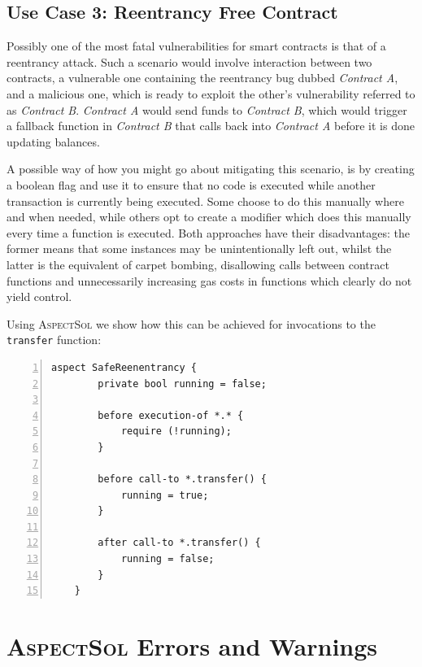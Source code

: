 \documentclass{article}
\newcommand{\AspectSol}{\textsc{AspectSol}\xspace}
\begin{document}
\subsection{Use Case 3: Reentrancy Free Contract}

Possibly one of the most fatal vulnerabilities for smart contracts is that of a reentrancy attack. Such a scenario would involve interaction between two contracts, a vulnerable one containing the reentrancy bug dubbed \textit{Contract A}, and a malicious one, which is ready to exploit the other's vulnerability referred to as \textit{Contract B}. \textit{Contract A} would send funds to \textit{Contract B}, which would trigger a fallback function in \textit{Contract B} that calls back into \textit{Contract A} before it is done updating balances.

A possible way of how you might go about mitigating this scenario, is by creating a boolean flag and use it to ensure that no code is executed while another transaction is currently being executed. Some choose to do this manually where and when needed, while others opt to create a modifier which does this manually every time a function is executed. Both approaches have their disadvantages: the former means that some instances may be unintentionally left out, whilst the latter is the equivalent of carpet bombing, disallowing calls between contract functions and unnecessarily increasing gas costs in functions which clearly do not yield control.

Using \AspectSol we show how this can be achieved for invocations to the \texttt{transfer} function:

\small\begin{lstlisting}[language=Solidity,numbers=left,numbersep=2pt,xleftmargin=0.3cm,label={code:reentracnyMitigationScript}, caption={Reentrancy Mitigation \AspectSol Script.}]
    aspect SafeReenentrancy {
        private bool running = false;
        
        before execution-of *.* { 
            require (!running);
        }
        
        before call-to *.transfer() {
            running = true;
        }
        
        after call-to *.transfer() {
            running = false;
        }
    }
\end{lstlisting}\normalsize
		
		
\section{\AspectSol Errors and Warnings}
\end{document}
